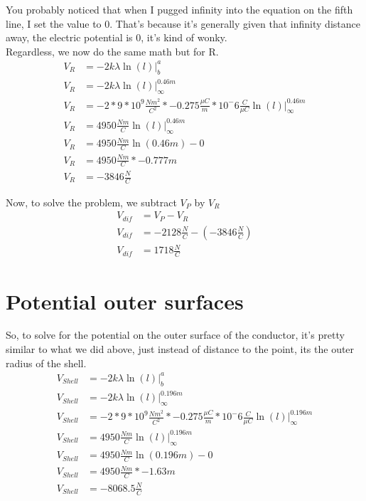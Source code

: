 \documentclass{article}
\begin{document}
You probably noticed that when I pugged infinity into the equation on the fifth line, I set the value to 0. That's because it's generally given that infinity distance away, the electric potential is 0, it's kind of wonky. \\
Regardless, we now do the same math but for R.\\ 

\begin{align*}
	V_{R} &= -2k\lambda\ln(l)\bigg|^a_{b}\\
	V_{R} &= -2k\lambda\ln(l)\bigg|^{0.46m}_{\infty}\\
	V_{R}&= -2 * 9 * 10^9 \frac{Nm^2}{C^2} * -0.275 \frac{\mu C}{m} * 10^-6 \frac{C}{\mu C} \ln(l)\bigg|^{0.46m}_{\infty}\\
	V_{R} &= 4950 \frac{Nm}{C} \ln(l)\bigg|^{0.46m}_{\infty}\\
	V_{R} &= 4950 \frac{Nm}{C}\ln(0.46m) -0\\
	V_{R} &= 4950 \frac{Nm}{C}* -0.777m\\
	V_{R} &= -3846 \frac{N}{C}
\end{align*}

Now, to solve the problem, we subtract $V_{P}$ by $V_{R}$\\
\begin{align*}
	V_{dif} &= V_{P}-V_{R}\\
	V_{dif} &= -2128 \frac{N}{C} - (-3846 \frac{N}{C})\\
	V_{dif} &= 1718 \frac{N}{C}
\end{align*}

\section{Potential outer surfaces}
So, to solve for the potential on the outer surface of the conductor, it's pretty similar to what we did above, just instead of distance to the point, its the outer radius of the shell. 
\begin{align*}
	V_{Shell} &= -2k\lambda\ln(l)\bigg|^a_{b}\\
	V_{Shell} &= -2k\lambda\ln(l)\bigg|^{0.196m}_{\infty}\\
	V_{Shell}&= -2 * 9 * 10^9 \frac{Nm^2}{C^2} * -0.275 \frac{\mu C}{m} * 10^-6 \frac{C}{\mu C} \ln(l)\bigg|^{0.196m}_{\infty}\\
	V_{Shell} &= 4950 \frac{Nm}{C} \ln(l)\bigg|^{0.196m}_{\infty}\\
	V_{Shell} &= 4950 \frac{Nm}{C}\ln(0.196m) -0\\
	V_{Shell} &= 4950 \frac{Nm}{C}* -1.63m\\
	V_{Shell} &= -8068.5 \frac{N}{C}
\end{align*}
\end{document}
